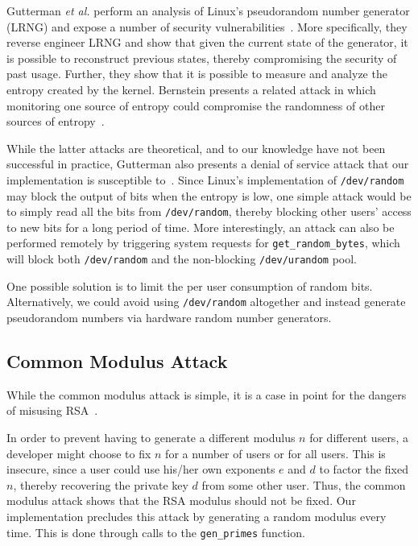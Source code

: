 \documentclass[letterpaper]{article}
\begin{document}
Gutterman \emph{et al.} perform an analysis of Linux's pseudorandom number generator (LRNG) and expose a number of security vulnerabilities~\cite{gutterman2006analysis}. More specifically, they reverse engineer LRNG and show that given the current state of the generator, it is possible to reconstruct previous states, thereby compromising the security of past usage. Further, they show that it is possible to measure and analyze the entropy created by the kernel. Bernstein presents a related
attack in which monitoring one source of entropy could compromise the randomness of other sources of entropy~\cite{bernstein2014entropy}.

While the latter attacks are theoretical, and to our knowledge have not been successful in practice, Gutterman also presents a denial of service attack that our implementation is susceptible to~\cite{gutterman2006analysis}. Since Linux's implementation of {\tt /dev/random} may block the output of bits when the entropy is low, one simple attack would be to simply read all the bits from {\tt /dev/random}, thereby blocking other users' access to new bits for a long
period of time. More interestingly, an attack can also be performed remotely by triggering system requests for {\tt get\_random\_bytes}, which will block both {\tt /dev/random} and the non-blocking {\tt /dev/urandom} pool.

One possible solution is to limit the per user consumption of random bits. Alternatively, we could avoid using {\tt /dev/random} altogether and instead generate pseudorandom numbers via hardware random number generators.

\subsection{Common Modulus Attack}
While the common modulus attack is simple, it is a case in point for the dangers of misusing RSA~\cite{boneh1999twenty}.

In order to prevent having to generate a different modulus $n$ for different users, a developer might choose to fix $n$ for a number of users or for all users. This is insecure, since a user could use his/her own exponents $e$ and $d$ to factor the fixed $n$, thereby recovering the private key $d$ from some other user. Thus, the common modulus attack shows that the RSA modulus should not be fixed. Our implementation precludes this attack by generating a random modulus every time.
This is done through calls to the {\tt gen\_primes} function.
\end{document}
